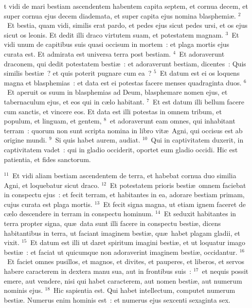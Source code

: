 \bchapter
{}t vidi de mari bestiam ascendentem habentem capita septem, et cornua decem, et super cornua ejus decem diademata, et super capita ejus nomina blasphemi\ae .
${}^{2}$~Et bestia, quam vidi, similis erat pardo, et pedes ejus sicut pedes ursi, et os ejus sicut os leonis. Et dedit illi draco virtutem suam, et potestatem magnam.
${}^{3}$~Et vidi unum de capitibus suis quasi occisum in mortem~: et plaga mortis ejus curata est. Et admirata est universa terra post bestiam.
${}^{4}$~Et adoraverunt draconem, qui dedit potestatem besti\ae~: et adoraverunt bestiam, dicentes~: Quis similis besti\ae~? et quis poterit pugnare cum ea~?
${}^{5}$~Et datum est ei os loquens magna et blasphemias~: et data est ei potestas facere menses quadraginta duos.
${}^{6}$~Et aperuit os suum in blasphemias ad Deum, blasphemare nomen ejus, et tabernaculum ejus, et eos qui in c\ae lo habitant.
${}^{7}$~Et est datum illi bellum facere cum sanctis, et vincere eos. Et data est illi potestas in omnem tribum, et populum, et linguam, et gentem,
${}^{8}$~et adoraverunt eam omnes, qui inhabitant terram~: quorum non sunt scripta nomina in libro vit\ae\ Agni, qui occisus est ab origine mundi.
${}^{9}$~Si quis habet aurem, audiat.
${}^{10}$~Qui in captivitatem duxerit, in captivitatem vadet~: qui in gladio occiderit, oportet eum gladio occidi. Hic est patientia, et fides sanctorum.


${}^{11}$~Et vidi aliam bestiam ascendentem de terra, et habebat cornua duo similia Agni, et loquebatur sicut draco.
${}^{12}$~Et potestatem prioris besti\ae\ omnem faciebat in conspectu ejus~: et fecit terram, et habitantes in ea, adorare bestiam primam, cujus curata est plaga mortis.
${}^{13}$~Et fecit signa magna, ut etiam ignem faceret de c\ae lo descendere in terram in conspectu hominum.
${}^{14}$~Et seduxit habitantes in terra propter signa, qu\ae\ data sunt illi facere in conspectu besti\ae , dicens habitantibus in terra, ut faciant imaginem besti\ae , qu\ae\ habet plagam gladii, et vixit.
${}^{15}$~Et datum est illi ut daret spiritum imagini besti\ae , et ut loquatur imago besti\ae~: et faciat ut quicumque non adoraverint imaginem besti\ae , occidantur.
${}^{16}$~Et faciet omnes pusillos, et magnos, et divites, et pauperes, et liberos, et servos habere caracterem in dextera manu sua, aut in frontibus suis~:
${}^{17}$~et nequis possit emere, aut vendere, nisi qui habet caracterem, aut nomen besti\ae , aut numerum nominis ejus.
${}^{18}$~Hic sapientia est. Qui habet intellectum, computet numerum besti\ae . Numerus enim hominis est~: et numerus ejus sexcenti sexaginta sex.

